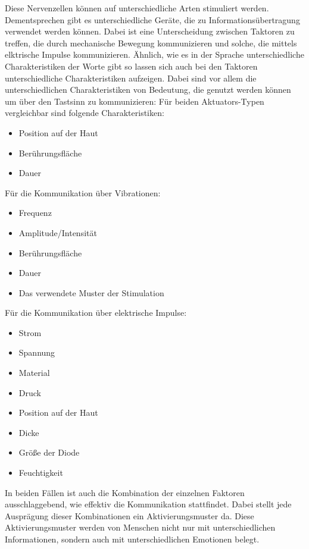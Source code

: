 \documentclass{llncs}					%
\begin{document}
Diese Nervenzellen können auf unterschiedliche Arten stimuliert werden. Dementsprechen gibt es unterschiedliche Geräte, die zu Informationsübertragung verwendet werden können. Dabei ist eine Unterscheidung zwischen Taktoren zu treffen, die durch mechanische Bewegung kommunizieren und solche, die mittels elktrische Impulse kommunizieren. Ähnlich, wie es in der Sprache unterschiedliche Charakteristiken der Worte gibt so lassen sich auch bei den Taktoren unterschiedliche Charakteristiken aufzeigen. Dabei sind vor allem die unterschiedlichen Charakteristiken von Bedeutung, die genutzt werden können um über den Tastsinn zu kommunizieren:
Für beiden \glspl{Aktuator}-Typen vergleichbar sind folgende Charakteristiken:
\begin{itemize}
	\item Position auf der Haut
	\item Berührungsfläche
	\item Dauer
\end{itemize}

Für die Kommunikation über Vibrationen\cite{doi:10.1518/001872008X250638}:
\begin{itemize}
	\item Frequenz
	\item Amplitude/Intensität %
	\item Berührungsfläche
	\item Dauer
	\item Das verwendete Muster der Stimulation %
\end{itemize}

Für die Kommunikation über elektrische Impulse\cite[S.~4]{68204}:
\begin{itemize}
	\item Strom
	\item Spannung
	\item Material
	\item Druck %
	\item Position auf der Haut
	\item Dicke
	\item Größe der Diode
	\item Feuchtigkeit
\end{itemize}

In beiden Fällen ist auch die Kombination der einzelnen Faktoren ausschlaggebend, wie effektiv die Kommunikation stattfindet. Dabei stellt jede Ausprägung dieser Kombinationen ein Aktivierungsmuster da. Diese Aktivierungsmuster werden von Menschen nicht nur mit unterschiedlichen Informationen, sondern auch mit unterschiedlichen Emotionen belegt.%
\end{document}
